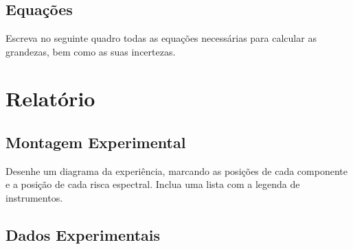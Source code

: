 \documentclass[a4paper,12pt]{article}  %
\begin{document}
\noindent\underline{\makebox[\textwidth][r]{~}} \\
\noindent\underline{\makebox[\textwidth][r]{~}} \\
\noindent\underline{\makebox[\textwidth][r]{~}} \\
\noindent\underline{\makebox[\textwidth][r]{~}} \\
\noindent\underline{\makebox[\textwidth][r]{~}} \\
\noindent\underline{\makebox[\textwidth][r]{~}} \\
\noindent\underline{\makebox[\textwidth][r]{~}} \\
\noindent\underline{\makebox[\textwidth][r]{~}} \\

\subsection{\sf Equações }
Escreva no seguinte quadro todas as equações necessárias para calcular as grandezas, bem como as suas incertezas.
\begin{center}
\framebox[15cm]{\rule{0pt}{8.5cm}}
\end{center}

\newpage
\section{\sf Relatório}
\subsection{\sf Montagem Experimental}
Desenhe um diagrama da experiência, marcando as posições de cada componente e a posição de cada risca espectral. Inclua uma lista com a  legenda de instrumentos.

\begin{center}
\framebox[18cm]{\rule{0pt}{6.5cm}}
\end{center}



\subsection{\sf Dados Experimentais}\label{sec:dados}
\end{document}
